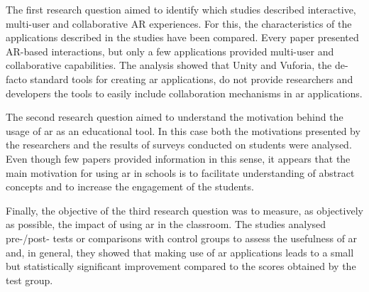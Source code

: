 The first research question aimed to identify which studies described interactive, multi-user and collaborative AR experiences. For this, the characteristics of the applications described in the studies have been compared. Every paper presented AR-based interactions, but only a few applications provided multi-user and collaborative capabilities. The analysis showed that Unity and Vuforia, the de-facto standard tools for creating \gls{ar} applications, do not provide researchers and developers the tools to easily include collaboration mechanisms in \gls{ar} applications.

The second research question aimed to understand the motivation behind the usage of \gls{ar} as an educational tool. In this case both the motivations presented by the researchers and the results of surveys conducted on students were analysed. Even though few papers provided information in this sense, it appears that the main motivation for using \gls{ar} in schools is to facilitate understanding of abstract concepts and to increase the engagement of the students.

Finally, the objective of the third research question was to measure, as objectively as possible, the impact of using \gls{ar} in the classroom. The studies analysed pre-/post- tests or comparisons with control groups to assess the usefulness of \gls{ar} and, in general, they showed that making use of \gls{ar} applications leads to a small but statistically significant improvement compared to the scores obtained by the test group.   